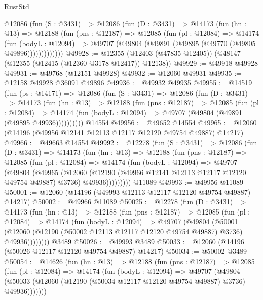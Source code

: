 \begin{lexlean}{RustStd}
\begin{coremodule}
      @12086
        (fun (S : @3431) =>
        @12086
          (fun (D : @3431) =>
          @14173
            (fun (hn : @13) =>
            @12188
              (fun (pns : @12187) =>
              @12085
                (fun (pl : @12084) =>
                @14174
                  (fun (bodyL : @12094) =>
                  @49707 (@49804 (@49891 (@49895 (@49770 (@49805 @49896)))))))))))))
@49928 := @12355 (@12403 (@47835 @12405)) (@48147 (@12355 (@12415 (@12360 @3178 @12417)) @12138))
@49929 := @49918 @49928
@49931 := @49768 (@12151 @49928)
@49932 := @12060 @49931
@49935 := @12158 @49928 @36091 @49896
@49936 := @49932 @49935
@49955 := @14519
    (fun (ps : @14171) =>
    @12086
      (fun (S : @3431) =>
      @12086
        (fun (D : @3431) =>
        @14173
          (fun (hn : @13) =>
          @12188
            (fun (pns : @12187) =>
            @12085
              (fun (pl : @12084) =>
              @14174 (fun (bodyL : @12094) => @49707 (@49804 (@49891 (@49895 @49936))))))))))
    @14554
@49956 := @49652 @14554
@49965 := @12060 (@14196 (@49956 @12141 @12113 @12117 @12120 @49754 @49887) @14217)
@49966 := @49663 @14554
@49992 := @12278
    (fun (S : @3431) =>
    @12086
      (fun (D : @3431) =>
      @14173
        (fun (hn : @13) =>
        @12188
          (fun (pns : @12187) =>
          @12085
            (fun (pl : @12084) =>
            @14174
              (fun (bodyL : @12094) =>
              @49707
                (@49804
                  (@49965
                    (@12060
                      (@12190 (@49966 @12141 @12113 @12117 @12120 @49754 @49887) @3736)
                      @49936)))))))))
    @11089
@49993 := @49956 @11089
@50001 := @12060 (@14196 (@49993 @12113 @12117 @12120 @49754 @49887) @14217)
@50002 := @49966 @11089
@50025 := @12278
    (fun (D : @3431) =>
    @14173
      (fun (hn : @13) =>
      @12188
        (fun (pns : @12187) =>
        @12085
          (fun (pl : @12084) =>
          @14174
            (fun (bodyL : @12094) =>
            @49707
              (@49804
                (@50001
                  (@12060 (@12190 (@50002 @12113 @12117 @12120 @49754 @49887) @3736) @49936))))))))
    @3489
@50026 := @49993 @3489
@50033 := @12060 (@14196 (@50026 @12117 @12120 @49754 @49887) @14217)
@50034 := @50002 @3489
@50054 := @14626
    (fun (hn : @13) =>
    @12188
      (fun (pns : @12187) =>
      @12085
        (fun (pl : @12084) =>
        @14174
          (fun (bodyL : @12094) =>
          @49707
            (@49804
              (@50033 (@12060 (@12190 (@50034 @12117 @12120 @49754 @49887) @3736) @49936)))))))

\end{coremodule}
\end{lexlean}
